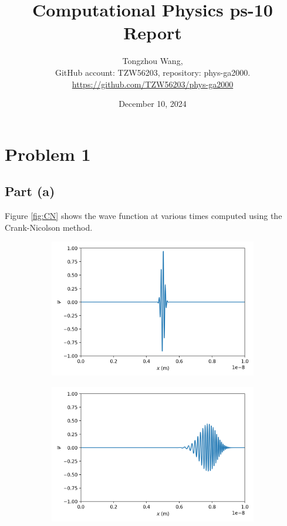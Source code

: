 \documentclass[11pt]{article}
\title{Computational Physics ps-10 Report}
\author{Tongzhou Wang, \\ GitHub account: TZW56203, repository: phys-ga2000. \\ \url{https://github.com/TZW56203/phys-ga2000}}
\date{December 10, 2024}
\begin{document}
\maketitle

\section{Problem 1}

\subsection{Part (a)}
Figure \ref{fig:CN} shows the wave function at various times computed using the Crank-Nicolson method.
\begin{figure}[H]
    \centering
    \begin{subfigure}[H]{0.48\textwidth}
        \centering
        \includegraphics[width=\textwidth]{Figs/ps-10-1-0.png}
    \end{subfigure}
    \hfill
    \centering
    \begin{subfigure}[H]{0.48\textwidth}
        \centering
        \includegraphics[width=\textwidth]{Figs/ps-10-1-1.png}
    \end{subfigure}


\end{figure}
\end{document}
